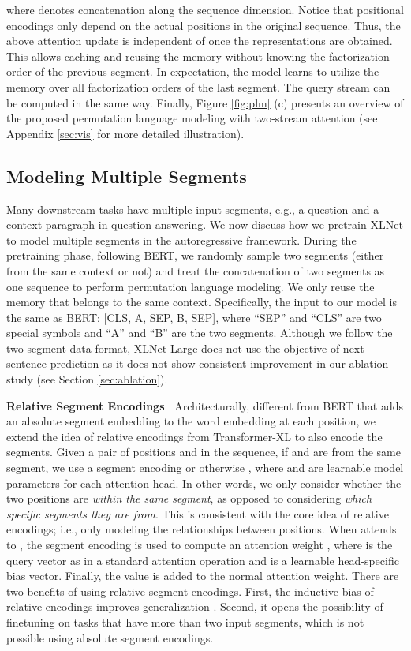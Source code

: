 \documentclass{article}
\begin{document}
where  denotes concatenation along the sequence dimension. 
Notice that positional encodings only depend on the actual positions in the original sequence. Thus, the above attention update is independent of  once the representations  are obtained. 
This allows caching and reusing the memory without knowing the factorization order of the previous segment.
In expectation, the model learns to utilize the memory over all factorization orders of the last segment.
The query stream can be computed in the same way.
Finally, Figure \ref{fig:plm} (c) presents an overview of the proposed permutation language modeling with two-stream attention (see Appendix \ref{sec:vis} for more detailed illustration).

\subsection{Modeling Multiple Segments}

Many downstream tasks have multiple input segments, e.g., a question and a context paragraph in question answering. We now discuss how we pretrain XLNet to model multiple segments in the autoregressive framework. During the pretraining phase, following BERT, we randomly sample two segments (either from the same context or not) and treat the concatenation of two segments as one sequence to perform permutation language modeling. We only reuse the memory that belongs to the same context. Specifically, the input to our model is the same as BERT: [CLS, A, SEP, B, SEP], where ``SEP'' and ``CLS'' are two special symbols and ``A'' and ``B'' are the two segments.
Although we follow the two-segment data format, XLNet-Large does not use the objective of next sentence prediction \cite{devlin2018bert} as it does not show consistent improvement in our ablation study (see Section \ref{sec:ablation}).

\textbf{Relative Segment Encodings~}
Architecturally, different from BERT that adds an absolute segment embedding to the word embedding at each position, we extend the idea of relative encodings from Transformer-XL to also encode the segments. Given a pair of positions  and  in the sequence, if  and  are from the same segment, we use a segment encoding  or otherwise , where  and  are learnable model parameters for each attention head. In other words, we only consider whether the two positions are \textit{within the same segment}, as opposed to considering \textit{which specific segments they are from}. This is consistent with the core idea of relative encodings; i.e., only modeling the relationships between positions. When  attends to , the segment encoding  is used to compute an attention weight , where  is the query vector as in a standard attention operation and  is a learnable head-specific bias vector. Finally, the value  is added to the normal attention weight. There are two benefits of using relative segment encodings. First, the inductive bias of relative encodings improves generalization \cite{dai2019transformer}. Second, it opens the possibility of finetuning on tasks that have more than two input segments, which is not possible using absolute segment encodings.
\end{document}
